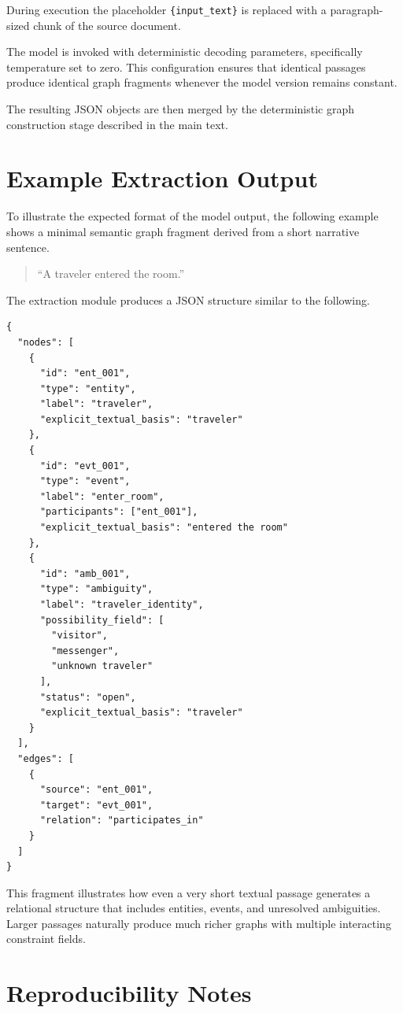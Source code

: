 \documentclass[12pt, a4paper]{article}
\begin{document}
During execution the placeholder \texttt{\{input\_text\}} is replaced with a paragraph-sized chunk of the source document.

The model is invoked with deterministic decoding parameters, specifically temperature set to zero. This configuration ensures that identical passages produce identical graph fragments whenever the model version remains constant.

The resulting JSON objects are then merged by the deterministic graph construction stage described in the main text.

\section{Example Extraction Output}

To illustrate the expected format of the model output, the following example shows a minimal semantic graph fragment derived from a short narrative sentence.

\begin{quote}
``A traveler entered the room.''
\end{quote}

The extraction module produces a JSON structure similar to the following.

\begin{verbatim}
{
  "nodes": [
    {
      "id": "ent_001",
      "type": "entity",
      "label": "traveler",
      "explicit_textual_basis": "traveler"
    },
    {
      "id": "evt_001",
      "type": "event",
      "label": "enter_room",
      "participants": ["ent_001"],
      "explicit_textual_basis": "entered the room"
    },
    {
      "id": "amb_001",
      "type": "ambiguity",
      "label": "traveler_identity",
      "possibility_field": [
        "visitor",
        "messenger",
        "unknown traveler"
      ],
      "status": "open",
      "explicit_textual_basis": "traveler"
    }
  ],
  "edges": [
    {
      "source": "ent_001",
      "target": "evt_001",
      "relation": "participates_in"
    }
  ]
}
\end{verbatim}

This fragment illustrates how even a very short textual passage generates a relational structure that includes entities, events, and unresolved ambiguities. Larger passages naturally produce much richer graphs with multiple interacting constraint fields.

\section{Reproducibility Notes}
\end{document}
